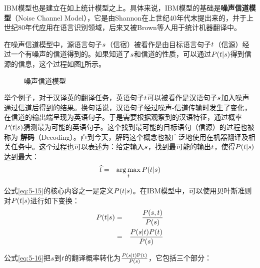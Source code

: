 \vspace{-0.5em}
\parinterval IBM模型也是建立在如上统计模型之上。具体来说，IBM模型的基础是{\small\sffamily\bfseries{噪声信道模型}}（Noise Channel Model），它是由Shannon在上世纪40年代末提出来的，并于上世纪80年代应用在语言识别领域，后来又被Brown等人用于统计机器翻译中。

\parinterval 在噪声信道模型中，源语言句子${s}$（信宿）被看作是由目标语言句子${t}$（信源）经过一个有噪声的信道得到的。如果知道了${s}$和信道的性质，可以通过${P}({t}|{s})$得到信源的信息，这个过程如图\ref{fig:5-13}所示。

\begin{figure}[htp]
    \centering

    \caption{噪声信道模型}
    \label{fig:5-13}
\end{figure}

\parinterval 举个例子，对于汉译英的翻译任务，英语句子${t}$可以被看作是汉语句子${s}$加入噪声通过信道后得到的结果。换句话说，汉语句子经过噪声-信道传输时发生了变化，在信道的输出端呈现为英语句子。于是需要根据观察到的汉语特征，通过概率${P}({t}|{s})$猜测最为可能的英语句子。这个找到最可能的目标语句（信源）的过程也被称为
{\small\sffamily\bfseries{解码}}（Decoding）。直到今天，解码这个概念也被广泛地使用在机器翻译及相关任务中。这个过程也可以表述为：给定输入${s}$，找到最可能的输出${t}$，使得${P}({t}|{s})$达到最大：
\begin{eqnarray}
\widehat{{t}}&=&\operatorname*{arg\,max}_{{t}}{P}({t}|{s})
\label{eq:5-15}
\end{eqnarray}

\parinterval 公式\eqref{eq:5-15}的核心内容之一是定义${P}({t}|{s})$。在IBM模型中，可以使用贝叶斯准则对${P}({t}|{s})$进行如下变换：
\begin{eqnarray}
{P}({t}|{s}) & = &\frac{{P}({s},{t})}{{P}({s})} \nonumber \\
                       & = & \frac{{P}({s}|{t}){P}({t})}{{P}({s})}
\label{eq:5-16}
\end{eqnarray}

\parinterval 公式\eqref{eq:5-16}把${s}$到${t}$的翻译概率转化为$\frac{{P}({s}|{t})\textrm{P(t)}}{{P}({s})}$，它包括三个部分：

